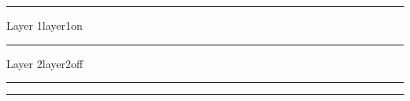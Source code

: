 \documentclass[12pt]{minimal}
\begin{document}
{\color{red}\rule{1cm}{1cm}}
%
\begin{ocg}{Layer 1}{layer1}{on}
{\color{green}\rule{1cm}{1cm}}
\end{ocg}
\begin{ocg}{Layer 2}{layer2}{off}
{\color{yellow}\rule{1cm}{1cm}}
\end{ocg}
%
{\color{blue}\rule{1cm}{1cm}}


\end{document}
